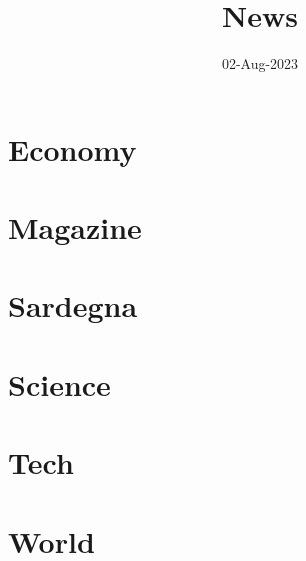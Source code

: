 \documentclass{article}
\title{News}
\author{}
\date{02-Aug-2023}
\begin{document}
    \maketitle
    \tableofcontents

    \section{Economy}
    

    \section{Magazine}
    

    \section{Sardegna}
    

    \section{Science}
    

    \section{Tech}
    

    \section{World}
    
\end{document}
